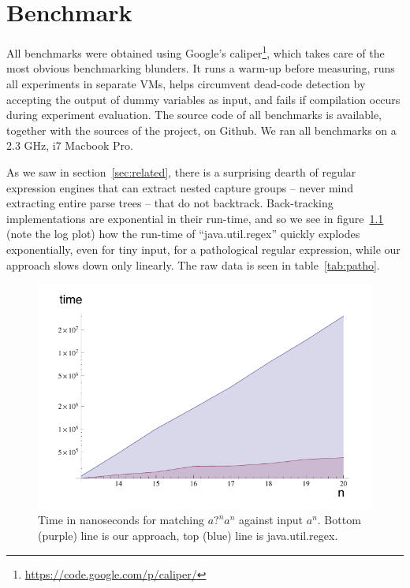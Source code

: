\documentclass[11pt]{Thesis}
\theoremstyle{definition}
\newcommand{\Figref}[1]{figure~\ref{fig:#1}}
\newcommand{\Secref}[1]{section~\ref{sec:#1}}
\newcommand{\Tabref}[1]{table~\ref{tab:#1}}
\newcommand{\figlabel}[1]{\label{fig:#1}}
\newcommand{\seclabel}[1]{\label{sec:#1}}
\begin{document}
\chapter{Benchmark}
\seclabel{benchmarks}
All benchmarks were obtained using Google's
caliper\footnote{\url{https://code.google.com/p/caliper/}}, which
takes care of the most obvious benchmarking blunders.  It runs a
warm-up before measuring, runs all experiments in separate VMs,
helps circumvent dead-code detection by accepting the output of
dummy variables as input, and fails if compilation occurs during
experiment evaluation.  The source code of all benchmarks is
available, together with the sources of the project, on Github. We
ran all benchmarks on a 2.3 GHz, i7 Macbook Pro.

As we saw in \Secref{related}, there is a surprising dearth
of regular expression engines that can extract nested capture groups
-- never mind extracting entire parse trees -- that do not backtrack.
Back-tracking implementations are exponential in their run-time,
and so we see in \Figref{patho} (note the log plot) how the run-time
of ``java.util.regex'' quickly explodes exponentially, even for tiny input, for
a pathological regular expression, while our approach slows down
only linearly. The raw data is seen in \Tabref{patho}.

\begin{figure}[htp]
\includegraphics[width=\linewidth]{graphs/pathological-with-axes.pdf}
\caption[Pathological regular expression parse time]{Time in nanoseconds for matching $\textit{a?}^n\textit{a}^n$ against
input $\textit{a}^n$. Bottom (purple) line is our approach, top (blue) line is
java.util.regex.}
\figlabel{patho}
\end{figure}
\end{document}
